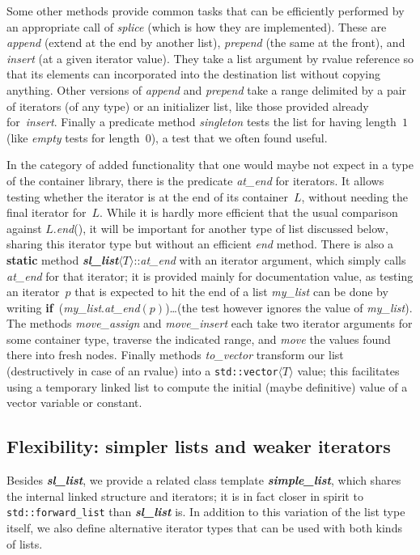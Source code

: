 \documentclass[12pt]{article}
\theoremstyle{plain}
\theoremstyle{definition}
\newcommand\std[1]{\texttt{std::#1}}
\def\frwl.{\std{forward\_list}}
\def\vect.{\std{vector}}
\def\slls.{\textbf{\textit{sl\_\!list}}}
\def\smpl.{\textbf{\textit{simple\_\!list}}}
\def\atend.{\textit{at\_\!end}}
\def\ang#1{\langle#1\rangle}
\def\atT{$\ang T$::}
\begin{document}
Some other methods provide common tasks that can be efficiently performed by an
appropriate call of \textit{splice} (which is how they are implemented). These
are \textit{append} (extend at the end by another list), \textit{prepend} (the
same at the front), and \textit{insert} (at a given iterator value). They take a
list argument by rvalue reference so that its elements can incorporated into the
destination list without copying anything. Other versions of \textit{append} and
\textit{prepend} take a range delimited by a pair of iterators (of any type) or
an initializer list, like those provided already for~\textit{insert}. Finally a
predicate method \textit{singleton} tests the list for having length~$1$ (like
\textit{empty} tests for length~$0$), a test that we often found useful.

In the category of added functionality that one would maybe not expect in a type
of the container library, there is the predicate \atend. for iterators. It
allows testing whether the iterator is at the end of its container~$L$, without
needing the final iterator for~$L$. While it is hardly more efficient that the
usual comparison against $L$.\textit{end}(), it will be important for another
type of list discussed below, sharing this iterator type but without an
efficient \textit{end} method. There is also a \textbf{static} method
\slls.\atT\atend. with an iterator argument, which simply calls \atend.
for that iterator; it is provided mainly for documentation value, as testing an
iterator~$p$ that is expected to hit the end of a list \textit{my\_\!list} can
be done by writing \textbf{if}~(\textit{my\_\!list}.\atend.$(p)$)\dots (the test
however ignores the value of \textit{my\_\!list}). The methods
\textit{move\_\!assign} and \textit{move\_\!insert} each take two iterator
arguments for some container type, traverse the indicated range, and \emph{move}
the values found there into fresh nodes. Finally methods \textit{to\_\!vector}
transform our list (destructively in case of an rvalue) into a
\vect.$\ang{T}$ value; this facilitates using a temporary linked list to
compute the initial (maybe definitive) value of a vector variable or constant.


\subsection{Flexibility: simpler lists and weaker iterators}

Besides \slls., we provide a related class template \smpl., which shares the
internal linked structure and iterators; it is in fact closer in spirit to
\frwl. than \slls. is. In addition to this variation of the list type itself, we
also define alternative iterator types that can be used with both kinds of
lists.
\end{document}
